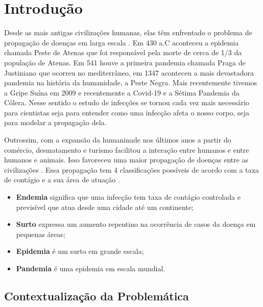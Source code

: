 \documentclass[12pt]{abnt-fisica11}%
\begin{document}
 
 
 
 

 

 
\sumario


\chapter{Introdução}

Desde as mais antigas civilizações humanas, elas têm enfrentado o problema de propagação de doenças em larga escala \cite{historic}. Em 430 a.C aconteceu a epidemia chamada Peste de Atenas que foi responsável pela morte de cerca de 1/3 da população de Atenas. Em 541 houve a primeira pandemia chamada Praga de Justiniano que ocorreu no mediterrâneo, em 1347 aconteceu a mais devastadora pandemia na história da humanidade, a Peste Negra. Mais recentemente tivemos a Gripe Suína em 2009 e recentemente a Covid-19 e a Sétima Pandemia da Cólera. Nesse sentido o estudo de infecções se tornou cada vez mais necessário para cientistas seja para entender como uma infecção afeta o nosso corpo, seja para modelar a propagação dela.

Outrossim, com a expansão da humaninade nos últimos anos a partir do comércio, desmatamento e turismo facilitou a interação entre humanos e entre humanos e animais. Isso favoreceu uma maior propagação de doenças entre as civilizações \cite{area}. Essa propagação tem 4 classificações possíveis de acordo com a taxa de contágio e a sua área de atuação \cite{whats}.

\begin{itemize}
  \item \textbf{Endemia} significa que uma infecção tem taxa de contágio controlada e previsível que atua desde uma cidade até um continente;
  \item \textbf{Surto} expressa um aumento repentino na ocorrência de casos da doença em pequenas áreas;
  \item \textbf{Epidemia} é um surto em grande escala;
  \item \textbf{Pandemia} é uma epidemia em escala mundial.
\end{itemize}

\section{Contextualização da Problemática}
\end{document}
